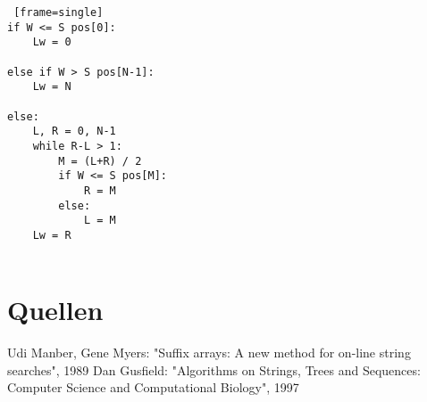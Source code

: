 \documentclass[twoside]{article}
\begin{document}
\begin{lstlisting} [frame=single]
if W <= S pos[0]:
    Lw = 0

else if W > S pos[N-1]:
    Lw = N

else:
    L, R = 0, N-1
    while R-L > 1:
        M = (L+R) / 2
        if W <= S pos[M]:
            R = M
        else:
            L = M
    Lw = R


\end{lstlisting}




\section{Quellen}
Udi Manber, Gene Myers: "Suffix arrays: A new method for on-line string searches", 1989
Dan Gusfield: "Algorithms on Strings, Trees and Sequences: Computer Science and Computational Biology", 1997


\end{document}

